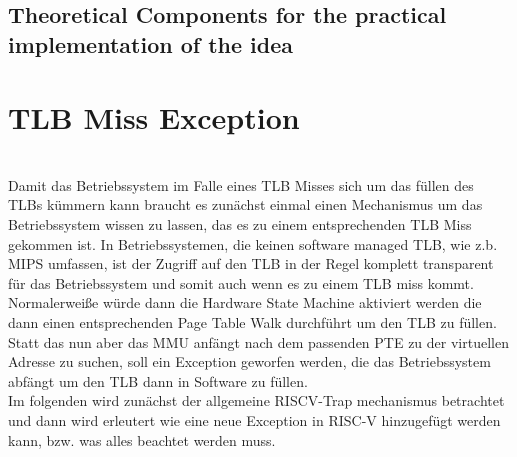 \subsection{Theoretical Components for the practical implementation of the idea}




\section{TLB Miss Exception}
\\
Damit das Betriebssystem im Falle eines TLB Misses sich um das füllen des TLBs kümmern kann
braucht es zunächst einmal einen Mechanismus um das Betriebssystem wissen zu lassen,
das es zu einem entsprechenden TLB Miss gekommen ist. In Betriebssystemen, die keinen
software managed TLB, wie z.b. MIPS \cite{MIPSArchitectureProgrammers2016} umfassen, ist der
Zugriff auf den TLB in der Regel komplett transparent für das Betriebssystem und somit auch wenn
es zu einem TLB miss kommt. Normalerweiße würde dann die Hardware State Machine aktiviert werden
die dann einen entsprechenden Page Table Walk durchführt um den TLB zu füllen.
\\
Statt das nun aber das MMU anfängt nach dem passenden PTE zu der virtuellen Adresse zu suchen,
soll ein Exception geworfen werden, die das Betriebssystem abfängt um den TLB dann in Software
zu füllen.\\
Im folgenden wird zunächst der allgemeine RISCV-Trap mechanismus betrachtet und dann
wird erleutert wie eine neue Exception in RISC-V hinzugefügt werden kann, bzw. was alles beachtet
werden muss.
